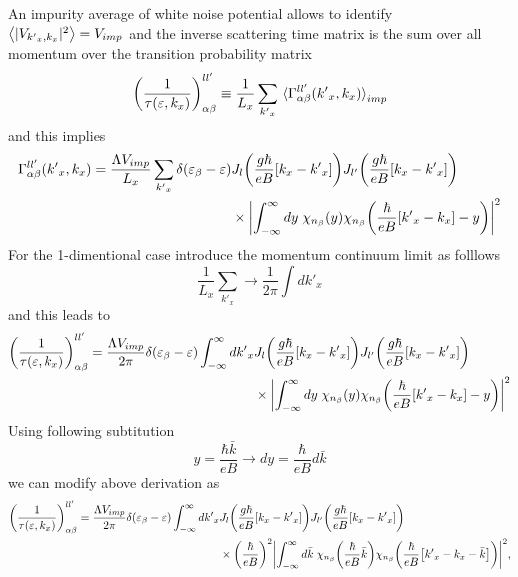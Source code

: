 \noindent
An impurity average of white noise potential allows to identify $\expval{|V_{{k'}_x,k_x}|^2} = V_{imp}$ and the inverse scattering time matrix is the sum over all momentum over the transition probability matrix
\begin{equation} \label{4.59}
    \qty(\frac{1}{\tau(\varepsilon,k_x)})^{ll'}_{\alpha\beta} \equiv
    \frac{1}{L_x} \sum_{{k'}_x}
    \expval**{\Gamma_{\alpha\beta}^{ll'}({k'}_x,k_x)}_{imp}
\end{equation}
and this implies
\begin{equation} \label{4.60}
  \begin{aligned}
    \Gamma_{\alpha\beta}^{ll'}({k'}_x,k_x) =
    \frac{\Lambda V_{imp}}{L_x} \sum_{{k'}_x}
    \delta(\varepsilon_{\beta} - \varepsilon) &
    J_l\qty(\frac{g\hbar}{eB}[{k}_x - {k'}_x])
    J_{l'}\qty(\frac{g\hbar}{eB}[{k}_x - {k'}_x]) \\
    & \times
    \qty|
    \int_{-\infty}^{\infty} dy \;
    {\chi}_{n_{\beta}}\qty(y)
    {\chi}_{n_{\beta}}\qty(\frac{\hbar}{eB} \qty[{k'}_x - {k}_x] - y)|^2
  \end{aligned}
\end{equation}
For the 1-dimentional case introduce the momentum continuum limit as folllows
\begin{equation} \label{4.61}
    \frac{1}{L_x} \sum_{{k'}_x} \longrightarrow
    \frac{1}{2\pi}\int d {k'}_x
\end{equation}
and this leads to
\begin{equation} \label{4.62}
  \begin{aligned}
    \qty(\frac{1}{\tau(\varepsilon,k_x)})^{ll'}_{\alpha\beta} =
    \frac{\Lambda V_{imp}}{2\pi}
    \delta(\varepsilon_{\beta} - \varepsilon)
    \int_{-\infty}^{\infty} d {k'}_x
    &
    J_l\qty(\frac{g\hbar}{eB}[{k}_x - {k'}_x])
    J_{l'}\qty(\frac{g\hbar}{eB}[{k}_x - {k'}_x]) \\
    & \times
    \qty|
    \int_{-\infty}^{\infty} dy \;
    {\chi}_{n_{\beta}}\qty(y)
    {\chi}_{n_{\beta}}\qty(\frac{\hbar}{eB} \qty[{k'}_x - {k}_x] - y)|^2
  \end{aligned}
\end{equation}
Using following subtitution
\begin{equation} \label{4.63}
    y = \frac{\hbar \bar{k}}{eB} \longrightarrow
    dy = \frac{\hbar }{eB} d\bar{k}
\end{equation}
we can modify above derivation as
\begin{equation} \label{4.64}
  \begin{aligned}
    \qty(\frac{1}{\tau(\varepsilon,k_x)})^{ll'}_{\alpha\beta} =
    \frac{\Lambda V_{imp}}{2\pi}
    \delta(\varepsilon_{\beta} - \varepsilon)
    \int_{-\infty}^{\infty} d {k'}_x
    &
    J_l\qty(\frac{g\hbar}{eB}[{k}_x - {k'}_x])
    J_{l'}\qty(\frac{g\hbar}{eB}[{k}_x - {k'}_x]) \\
    & \times
    \qty(\frac{\hbar }{eB})^2
    \qty|
    \int_{-\infty}^{\infty} d\bar{k} \;
    {\chi}_{n_{\beta}}\qty(\frac{\hbar}{eB}\bar{k})
    {\chi}_{n_{\beta}}\qty(\frac{\hbar}{eB} \qty[{k'}_x - {k}_x - \bar{k}])|^2,
  \end{aligned}
\end{equation}

